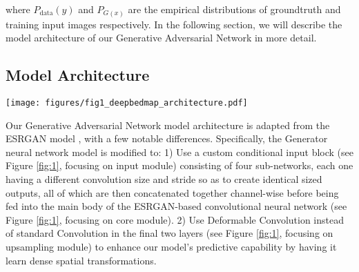 \documentclass[tc, manuscript]{copernicus}
\begin{document}
where $P_{\text{data}}(y)$ and $P_{G(x)}$ are the empirical distributions of groundtruth and training input images respectively.
In the following section, we will describe the model architecture of our Generative Adversarial Network in more detail.

\subsection{Model Architecture}

\begin{figure*}[ht]
  \texttt{[image: figures/fig1\_deepbedmap\_architecture.pdf]}
  \caption{
    DeepBedMap Generator Model Architecture.
    The input module on the left is made up of 4 sub-networks, each one composed of a convolutional neural network that processes the input image into a consistent 9x9 shaped tensor.
    From top to bottom, we have our prior low resolution input BEDMAP2 \citep{FretwellBedmap2improvedice2013}, and conditional inputs REMA \citep{HowatReferenceElevationModel2019}, MEaSUREs Ice Veloctiy \citep{MouginotContinentwideinterferometric2019}, and Snow Accumulation \citep{ArthernAntarcticsnowaccumulation2006}, more details of which can be found in Table \ref{table:datainputs}.
    All the processed inputs are then concatenated together channel-wise before being fed into the core module.
    The core module in the middle is based on the ESRGAN architecture with 12 Residual-in-Residual Dense Blocks \citep[see][for details]{WangESRGANEnhancedSuperResolution2018}, saddled in between a pre-residual and post-residual convolutional layer.
    The upsampling module on the right is composed of two upsampling blocks (nearest neighbour upsampling followed by a convolutional layer and LeakyReLU activation) that progressively scales our tensors by 2x each time.
    Following this are two deformable convolutional layers \citep{DaiDeformableConvolutionalNetworks2017} which produces our final output super resolution DeepBedMap\_DEM.
  }
  \label{fig:1}
\end{figure*}

Our Generative Adversarial Network model architecture is adapted from the ESRGAN model \citep{WangESRGANEnhancedSuperResolution2018}, with a few notable differences.
Specifically, the Generator neural network model is modified to:
1) Use a custom conditional input block (see Figure \ref{fig:1}, focusing on input module) consisting of four sub-networks, each one having a different convolution size and stride so as to create identical sized outputs, all of which are then concatenated together channel-wise before being fed into the main body of the ESRGAN-based convolutional neural network (see Figure \ref{fig:1}, focusing on core module).
2) Use Deformable Convolution \citep{DaiDeformableConvolutionalNetworks2017} instead of standard Convolution in the final two layers (see Figure \ref{fig:1}, focusing on upsampling module) to enhance our model's predictive capability by having it learn dense spatial transformations.
\end{document}
